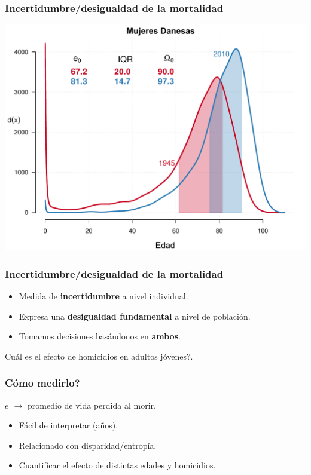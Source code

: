 \documentclass[xcolor={dvipsnames}]{beamer}
\begin{document}
\begin{frame}\frametitle{Incertidumbre/desigualdad de la mortalidad}
\Large{
\begin{center}
		\includegraphics[scale=.45]{Figures/Fig0}
				\end{center}
}
\end{frame}


\begin{frame}\frametitle{Incertidumbre/desigualdad de la mortalidad}
\large{
		\begin{itemize}
		
		\item Medida de \textbf{incertidumbre} a nivel individual.
		\pause
     	\item Expresa una \textbf{desigualdad fundamental} a nivel de poblaci\'on.
\pause
		\item Tomamos decisiones bas\'andonos en \textbf{ambos}.		
		\pause				
		\end{itemize}
}
\Large{
\begin{center}
Cu\'al es el efecto de homicidios en adultos j\'ovenes?.
\end{center}
}
\end{frame}




\begin{frame}\frametitle{C\'omo medirlo?}
\Large{
$e^{\dagger}\longrightarrow  $ promedio de vida perdida al morir.

\begin{itemize}
\item F\'acil de interpretar (a\~nos).
\item Relacionado con disparidad/entrop\'ia.
\item Cuantificar el efecto de distintas edades y homicidios.

\end{itemize}

}
\end{frame}
\end{document}
